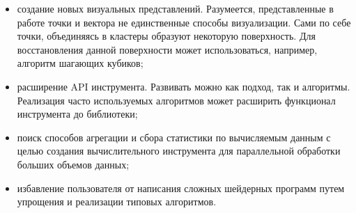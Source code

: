 \begin{itemize}
  \item создание новых визуальных представлений. Разумеется, представленные
    в работе точки и вектора не единственные способы визуализации.
    Сами по себе точки, объединяясь в кластеры образуют некоторую поверхность.
    Для восстановления данной поверхности может использоваться, например,
    алгоритм шагающих кубиков;
  \item расширение API инструмента. Развивать можно как подход, так и
    алгоритмы. Реализация часто используемых алгоритмов может расширить
    функционал инструмента до библиотеки;
  \item поиск способов агрегации и сбора статистики по вычисляемым
    данным с целью создания вычислительного инструмента для параллельной
    обработки больших объемов данных;
  \item избавление пользователя от написания сложных шейдерных программ
    путем упрощения и реализации типовых алгоритмов.
\end{itemize}
